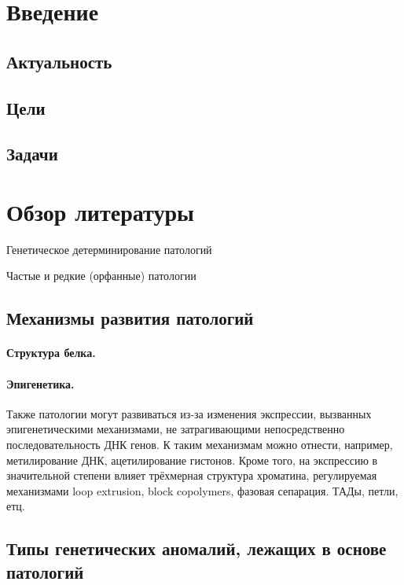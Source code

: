 \documentclass[a4paper,12pt]{article}
\begin{document}
\tableofcontents

\section{Введение}

\subsection{Актуальность}

\subsection{Цели}

\subsection{Задачи}

\section{Обзор литературы}

Генетическое детерминирование патологий

Частые и редкие (орфанные) патологии

\subsection{Механизмы развития патологий}

\paragraph{Структура белка.}

\paragraph{Эпигенетика.}
Также патологии могут развиваться из-за изменения экспрессии, вызванных эпигенетическими механизмами, не затрагивающими непосредственно последовательность ДНК генов.
К таким механизмам можно отнести, например, метилирование ДНК, ацетилирование гистонов.
Кроме того, на экспрессию в значительной степени влияет трёхмерная структура хроматина, регулируемая механизмами loop extrusion, block copolymers, фазовая сепарация.
ТАДы, петли, етц.

\subsection{Типы генетических аномалий, лежащих в основе патологий}
\end{document}
